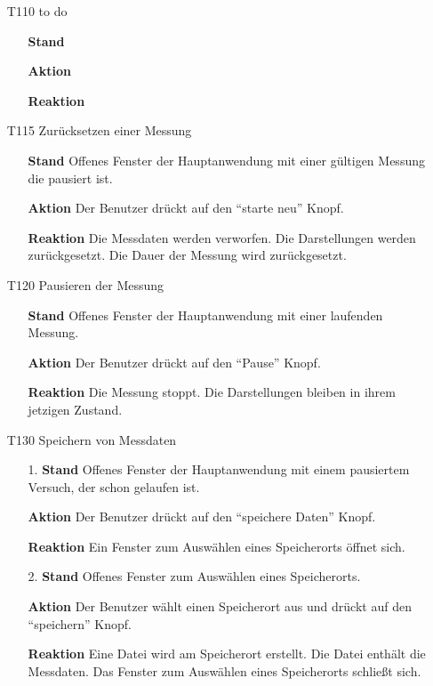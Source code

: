 \documentclass[parskip=full]{scrartcl}
\begin{document}
\begin{itemize}
\item[T110] to do
\begin{itemize}

\item[]\textbf {Stand} 
\item[]\textbf{Aktion} 
\item[]\textbf{Reaktion} 

\end{itemize}

\item[T115] Zurücksetzen einer Messung
\begin{itemize}

\item[]\textbf {Stand} Offenes Fenster der Hauptanwendung mit einer gültigen Messung die pausiert ist.
\item[]\textbf{Aktion} Der Benutzer drückt auf den "`starte neu"' Knopf.
\item[]\textbf{Reaktion} Die Messdaten werden verworfen. Die Darstellungen werden zurückgesetzt. Die Dauer der Messung wird zurückgesetzt.

\end{itemize}

\item[T120] Pausieren der Messung
\begin{itemize}

\item[]\textbf {Stand} Offenes Fenster der Hauptanwendung mit einer laufenden Messung.
\item[]\textbf{Aktion} Der Benutzer drückt auf den "`Pause"' Knopf.
\item[]\textbf{Reaktion} Die Messung stoppt. Die Darstellungen bleiben in ihrem jetzigen Zustand.

\end{itemize}

\item[T130] Speichern von Messdaten
\begin{itemize}

\item[1.]\textbf {Stand} Offenes Fenster der Hauptanwendung mit einem pausiertem Versuch, der schon gelaufen ist.
\item[]\textbf{Aktion} Der Benutzer drückt auf den "`speichere Daten"' Knopf.
\item[]\textbf{Reaktion} Ein Fenster zum Auswählen eines Speicherorts öffnet sich.

\item[2.]\textbf {Stand} Offenes Fenster zum Auswählen eines Speicherorts.
\item[]\textbf{Aktion} Der Benutzer wählt einen Speicherort aus und drückt auf den "`speichern"' Knopf.
\item[]\textbf{Reaktion} Eine Datei wird am Speicherort erstellt. Die Datei enthält die Messdaten. Das Fenster zum Auswählen eines Speicherorts schließt sich.


\end{itemize}
\end{itemize}
\end{document}
